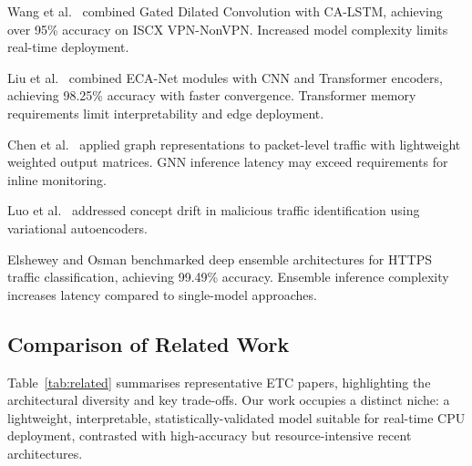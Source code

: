 \documentclass[conference]{IEEEtran}
\begin{document}
Wang et al.\ \cite{wang2024} combined Gated Dilated Convolution with CA-LSTM,
achieving over 95\% accuracy on ISCX VPN-NonVPN. Increased model complexity
limits real-time deployment.

Liu et al.\ \cite{liu2025} combined ECA-Net modules with CNN and Transformer
encoders, achieving 98.25\% accuracy with faster convergence. Transformer memory
requirements limit interpretability and edge deployment.

Chen et al.\ \cite{chen2025} applied graph representations to packet-level
traffic with lightweight weighted output matrices. GNN inference latency may
exceed requirements for inline monitoring.

Luo et al.\ \cite{luo2024} addressed concept drift in malicious traffic
identification using variational autoencoders.

Elshewey and Osman \cite{elshewey2025} benchmarked deep ensemble architectures
for HTTPS traffic classification, achieving 99.49\% accuracy. Ensemble inference
complexity increases latency compared to single-model approaches.

\subsection{Comparison of Related Work}

Table~\ref{tab:related} summarises representative ETC papers, highlighting
the architectural diversity and key trade-offs. Our work occupies a distinct
niche: a lightweight, interpretable, statistically-validated model suitable
for real-time CPU deployment, contrasted with high-accuracy but resource-intensive
recent architectures.
\end{document}
